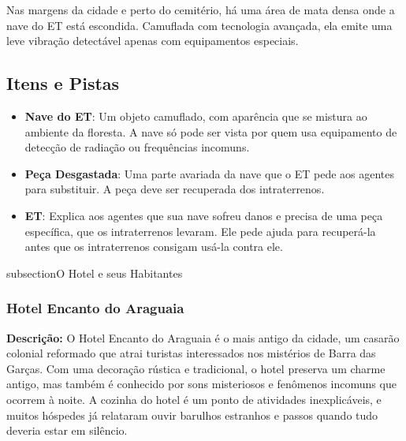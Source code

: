 Nas margens da cidade e perto do cemitério, há uma área de mata densa onde a nave do ET está escondida. Camuflada com tecnologia avançada, ela emite uma leve vibração detectável apenas com equipamentos especiais.

\subsection{Itens e Pistas}

\begin{itemize}
    \item \textbf{Nave do ET}: Um objeto camuflado, com aparência que se mistura ao ambiente da floresta. A nave só pode ser vista por quem usa equipamento de detecção de radiação ou frequências incomuns.
    \item \textbf{Peça Desgastada}: Uma parte avariada da nave que o ET pede aos agentes para substituir. A peça deve ser recuperada dos intraterrenos.
\end{itemize}


\begin{personagem}  

\begin{itemize}
    \item \textbf{ET}: Explica aos agentes que sua nave sofreu danos e precisa de uma peça específica, que os intraterrenos levaram. Ele pede ajuda para recuperá-la antes que os intraterrenos consigam usá-la contra ele.
\end{itemize}
\end{personagem}

subsection{O Hotel e seus Habitantes}

\subsubsection{Hotel Encanto do Araguaia}

\textbf{Descrição:}  
O Hotel Encanto do Araguaia é o mais antigo da cidade, um casarão colonial reformado que atrai turistas interessados nos mistérios de Barra das Garças. Com uma decoração rústica e tradicional, o hotel preserva um charme antigo, mas também é conhecido por sons misteriosos e fenômenos incomuns que ocorrem à noite. A cozinha do hotel é um ponto de atividades inexplicáveis, e muitos hóspedes já relataram ouvir barulhos estranhos e passos quando tudo deveria estar em silêncio.

